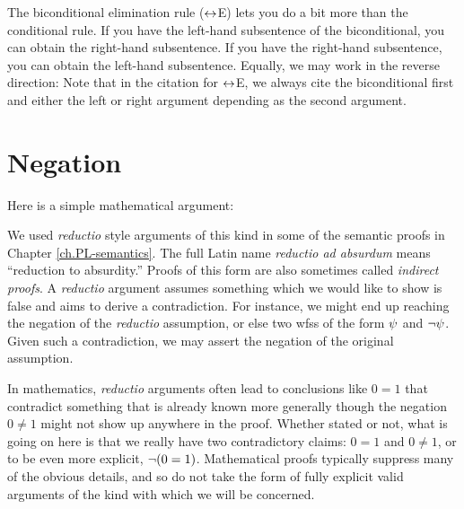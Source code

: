The biconditional elimination rule ($\leftrightarrow$E) lets you do a bit more than the conditional rule.
If you have the left-hand subsentence of the biconditional, you can obtain the right-hand subsentence.
If you have the right-hand subsentence, you can obtain the left-hand subsentence.
Equally, we may work in the reverse direction:
Note that in the citation for $\leftrightarrow$E, we always cite the biconditional first and either the left or right argument depending as the second argument.



\section{Negation}

Here is a simple mathematical argument:

\begin{earg}
\end{earg}

We used \textit{reductio} style arguments of this kind in some of the semantic proofs in Chapter \ref{ch.PL-semantics}. 
The full Latin name \emph{reductio ad absurdum} means ``reduction to absurdity.''
Proofs of this form are also sometimes called \textit{indirect proofs}.
A \textit{reductio} argument assumes something which we would like to show is false and aims to derive a contradiction.
For instance, we might end up reaching the negation of the \textit{reductio} assumption, or else two wfss of the form $\psi$ and $\neg\psi$.
Given such a contradiction, we may assert the negation of the original assumption.

In mathematics, \textit{reductio} arguments often lead to conclusions like $0=1$ that contradict something that is already known more generally though the negation $0\neq 1$ might not show up anywhere in the proof.
Whether stated or not, what is going on here is that we really have two contradictory claims: $0=1$ and $0\neq 1$, or to be even more explicit, $\neg(0=1)$.
Mathematical proofs typically suppress many of the obvious details, and so do not take the form of fully explicit valid arguments of the kind with which we will be concerned.

